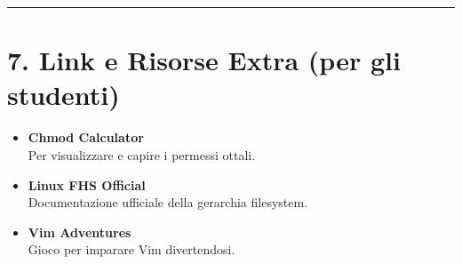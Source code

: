 \documentclass[11pt,a4paper]{article}
\begin{document}
\begin{center}\rule{0.5\linewidth}{0.5pt}\end{center}

\section{7. Link e Risorse Extra (per gli
studenti)}\label{link-e-risorse-extra-per-gli-studenti}

\begin{itemize}
\item
  \textbf{Chmod Calculator}\\
  Per visualizzare e capire i permessi ottali.
\item
  \textbf{Linux FHS Official}\\
  Documentazione ufficiale della gerarchia filesystem.
\item
  \textbf{Vim Adventures}\\
  Gioco per imparare Vim divertendosi.
\end{itemize}
\end{document}
